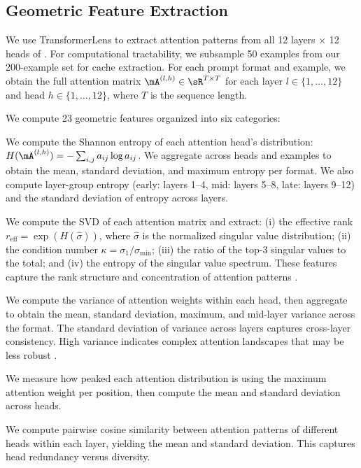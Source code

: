 \subsection{Geometric Feature Extraction}
\label{sec:features}

We use TransformerLens \citep{nanda2022transformerlens} to extract attention patterns from all 12 layers $\times$ 12 heads of \gptsmall.
For computational tractability, we subsample 50 examples from our 200-example set for cache extraction.
For each prompt format and example, we obtain the full attention matrix $\mA^{(l,h)} \in \sR^{T \times T}$ for each layer $l \in \{1,\ldots,12\}$ and head $h \in \{1,\ldots,12\}$, where $T$ is the sequence length.

We compute 23 geometric features organized into six categories:

We compute the Shannon entropy of each attention head's distribution: $H(\mA^{(l,h)}) = -\sum_{i,j} a_{ij} \log a_{ij}$.
We aggregate across heads and examples to obtain the mean, standard deviation, and maximum entropy per format.
We also compute layer-group entropy (early: layers 1--4, mid: layers 5--8, late: layers 9--12) and the standard deviation of entropy across layers.

We compute the SVD of each attention matrix and extract: (i) the effective rank $r_{\text{eff}} = \exp(H(\hat{\sigma}))$, where $\hat{\sigma}$ is the normalized singular value distribution; (ii) the condition number $\kappa = \sigma_1/\sigma_{\min}$; (iii) the ratio of the top-3 singular values to the total; and (iv) the entropy of the singular value spectrum.
These features capture the rank structure and concentration of attention patterns \citep{bussman2025beyond}.

We compute the variance of attention weights within each head, then aggregate to obtain the mean, standard deviation, maximum, and mid-layer variance across the format.
The standard deviation of variance across layers captures cross-layer consistency.
High variance indicates complex attention landscapes that may be less robust \citep{park2024geometry}.

We measure how peaked each attention distribution is using the maximum attention weight per position, then compute the mean and standard deviation across heads.

We compute pairwise cosine similarity between attention patterns of different heads within each layer, yielding the mean and standard deviation.
This captures head redundancy versus diversity.

